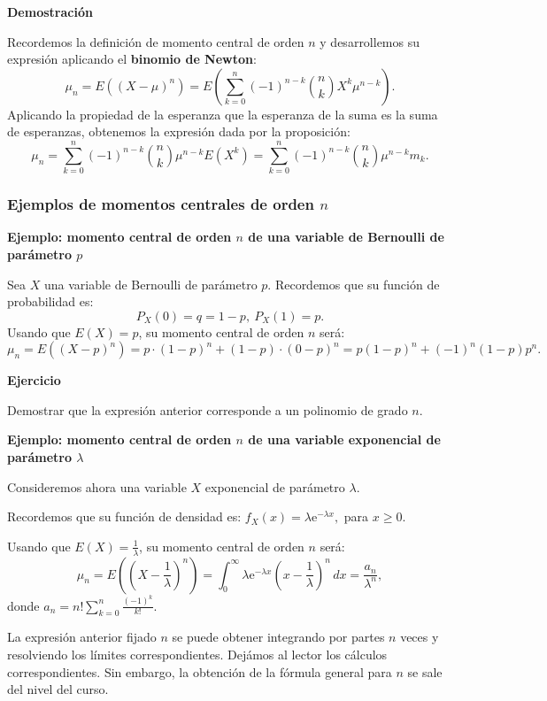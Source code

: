 \documentclass[]{book}
\begin{document}
\textbf{Demostración}

Recordemos la definición de momento central de orden \(n\) y desarrollemos su expresión aplicando el \textbf{binomio de Newton}:
\[
\mu_n = E\left((X-\mu)^n\right) =E\left(\sum_{k=0}^n (-1)^{n-k} \binom{n}{k} X^k\mu^{n-k}\right).
\]
Aplicando la propiedad de la esperanza que la esperanza de la suma es la suma de esperanzas, obtenemos la expresión dada por la proposición:
\[
\mu_n =\sum_{k=0}^n (-1)^{n-k} \binom{n}{k} \mu^{n-k} E\left(X^k\right) = \sum_{k=0}^n (-1)^{n-k} \binom{n}{k} \mu^{n-k} m_k.
\]

\hypertarget{ejemplos-de-momentos-centrales-de-orden-n}{%
\subsubsection{\texorpdfstring{Ejemplos de momentos centrales de orden \(n\)}{Ejemplos de momentos centrales de orden n}}\label{ejemplos-de-momentos-centrales-de-orden-n}}

\textbf{Ejemplo: momento central de orden \(n\) de una variable de Bernoulli de parámetro \(p\)}

Sea \(X\) una variable de Bernoulli de parámetro \(p\). Recordemos que su función de probabilidad es:
\[
P_X(0)=q=1-p,\ P_X(1)=p.
\]
Usando que \(E(X)=p\), su momento central de orden \(n\) será:
\[
\mu_n = E\left((X-p)^n\right)=p\cdot (1-p)^n+(1-p)\cdot (0-p)^n = p(1-p)^n + (-1)^n (1-p) p^n.
\]

\textbf{Ejercicio}

Demostrar que la expresión anterior corresponde a un polinomio de grado \(n\).

\textbf{Ejemplo: momento central de orden \(n\) de una variable exponencial de parámetro \(\lambda\)}

Consideremos ahora una variable \(X\) exponencial de parámetro \(\lambda\).

Recordemos que su función de densidad es: \(f_X(x)=\lambda \mathrm{e}^{-\lambda x},\) para \(x\geq 0\).

Usando que \(E(X)=\frac{1}{\lambda}\), su momento central de orden \(n\) será:
\[
\mu_n = E\left(\left(X-\frac{1}{\lambda}\right)^n\right)=\int_0^\infty \lambda \mathrm{e}^{-\lambda x} \left(x-\frac{1}{\lambda}\right)^n\, dx =\frac{a_n}{\lambda^n},
\]
donde \(a_n = n!\sum\limits_{k=0}^n \frac{(-1)^k}{k!}.\)

La expresión anterior fijado \(n\) se puede obtener integrando por partes \(n\) veces y resolviendo los límites correspondientes. Dejámos al lector los cálculos correspondientes. Sin embargo, la obtención de la fórmula general para \(n\) se sale del nivel del curso.
\end{document}
